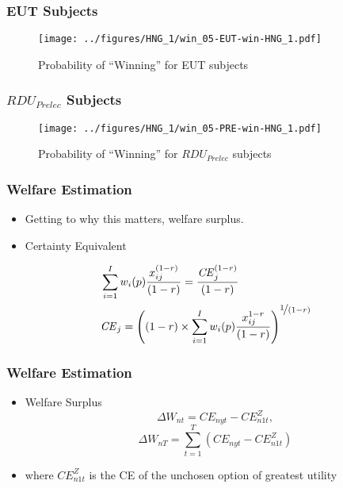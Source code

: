 \documentclass{beamer}
\newcommand\CE{\ensuremath{\mathit{CE}}}    %
\begin{document}
\begin{frame}
\frametitle{EUT Subjects}
\begin{figure}[h!]
	\center
	\caption{Probability of \enquote{Winning} for EUT subjects}
	\texttt{[image: ../figures/HNG\_1/win\_05-EUT-win-HNG\_1.pdf]}
	\label{fig:HN1_win_eut}
\end{figure}
\end{frame}

\begin{frame}
\frametitle{ $\mathit{RDU_{Prelec}}$ Subjects}
\begin{figure}[h!]
	\center
	\caption{Probability of \enquote{Winning} for $\mathit{RDU_{Prelec}}$ subjects}
	\texttt{[image: ../figures/HNG\_1/win\_05-PRE-win-HNG\_1.pdf]}
	\label{fig:HN1_win_pre}
\end{figure}
\end{frame}

\begin{frame}
\frametitle{Welfare Estimation}
\begin{itemize}
	\item Getting to why this matters, welfare surplus.
	\item Certainty Equivalent
\end{itemize}
\begin{align}
	\label{eq4:CEcalc}
	\begin{split}
		&\sum_{i=1}^{I} w_i(p) \frac{x_{ij}^{(1-r)}}{(1-r)} = \frac{ {\CE}_j^{(1-r)}}{(1-r)}\\
		&{\CE}_j =  \left( (1-r) \times \sum_{i=1}^{I} w_i(p) \frac{x_{ij}^{1-r}}{(1-r)} \right)^{ \displaystyle\nicefrac{1}{(1-r)} }
	\end{split}
\end{align}

\end{frame}

\begin{frame}
\frametitle{Welfare Estimation}
\begin{itemize}
	\item Welfare Surplus
	\begin{equation}
		\label{eq4:wsurplus}
		\Delta W_{nt} =  {\CE}_{nyt} - {\CE}_{n1t}^Z ,
	\end{equation}
	\begin{equation}
		\label{eq4:wsurplusT}
		\Delta W_{nT} = \sum_{t=1}^T \left( {\CE}_{nyt} - {\CE}_{n1t}^Z \right)
	\end{equation}
	\item  where ${\CE}_{n1t}^Z$ is the CE of the unchosen option of greatest utility
\end{itemize}
\end{frame}
\end{document}
